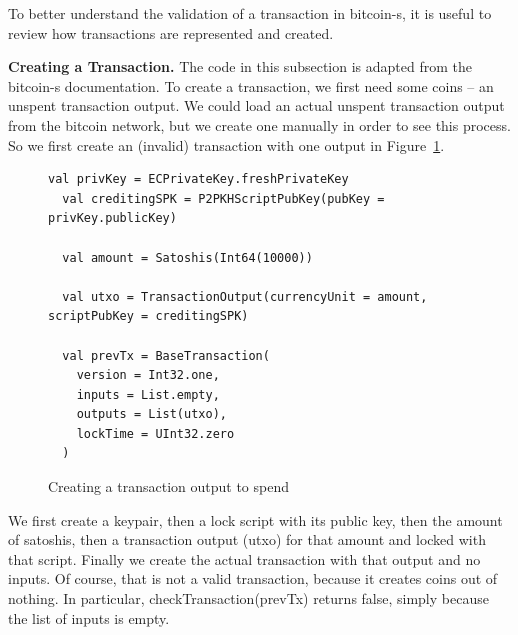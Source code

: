 \documentclass[runningheads]{llncs}
\renewcommand{\paragraph}{\textbf}%
\begin{document}
To better understand the validation of a transaction in bitcoin-s, it
is useful to review how transactions are represented and created.

\paragraph{Creating a Transaction.} The code in this subsection is
adapted from the bitcoin-s documentation. To create a transaction, we
first need some coins -- an unspent transaction output. We could load
an actual unspent transaction output from the bitcoin network, but we
create one manually in order to see this process. So we first create
an (invalid) transaction with one output in Figure~\ref{fig:prevtx}.

\begin{figure}
\begin{lstlisting}[style=scala]
  val privKey = ECPrivateKey.freshPrivateKey
  val creditingSPK = P2PKHScriptPubKey(pubKey = privKey.publicKey)

  val amount = Satoshis(Int64(10000))

  val utxo = TransactionOutput(currencyUnit = amount, scriptPubKey = creditingSPK)

  val prevTx = BaseTransaction(
    version = Int32.one,
    inputs = List.empty,
    outputs = List(utxo),
    lockTime = UInt32.zero
  )
\end{lstlisting}
  
  \caption{Creating a transaction output to spend}
  \label{fig:prevtx}
\end{figure}

We first create a keypair, then a lock script with its public key,
then the amount of satoshis, then a transaction output (utxo) for that
amount and locked with that script. Finally we create the actual
transaction with that output and no inputs. Of course, that is not a
valid transaction, because it creates coins out of nothing. In
particular, checkTransaction(prevTx) returns false, simply because the
list of inputs is empty.
\end{document}
